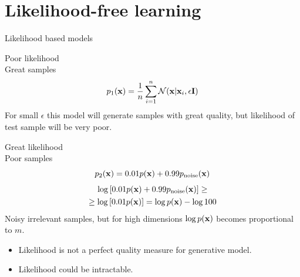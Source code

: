 \section{Likelihood-free learning}
\begin{frame}{Likelihood based models}
	\begin{minipage}[t]{0.48\columnwidth}
		\begin{block}{Poor likelihood \\ Great samples}
			\vspace{-0.3cm}
			\[
				p_1(\mathbf{x}) = \frac{1}{n} \sum_{i=1}^n \mathcal{N}(\mathbf{x} | \mathbf{x}_i, \epsilon \mathbf{I})
			\]
			For small $\epsilon$ this model will generate samples with great quality, but likelihood of test sample will be very poor.
		\end{block}
	\end{minipage}%
	\begin{minipage}[t]{0.52\columnwidth}
		\begin{block}{Great likelihood \\ Poor samples}
			\vspace{-0.3cm}
			\[
				p_2(\mathbf{x}) = 0.01p(\mathbf{x}) + 0.99p_{\text{noise}}(\mathbf{x})
			\]
			\begin{multline*}
				\log \left[ 0.01p(\mathbf{x}) + 0.99p_{\text{noise}}(\mathbf{x}) \right] \geq  \\ \geq \log \left[ 0.01p(\mathbf{x}) \right]  = \log p(\mathbf{x}) - \log 100
			\end{multline*}
		Noisy irrelevant samples, but for high dimensions $\log p(\mathbf{x})$ becomes proportional to $m$.
		\end{block}
	\end{minipage}
	\begin{itemize}
		\item Likelihood is not a perfect quality measure for generative model.
		\item Likelihood could be intractable.
	\end{itemize}
\end{frame}
